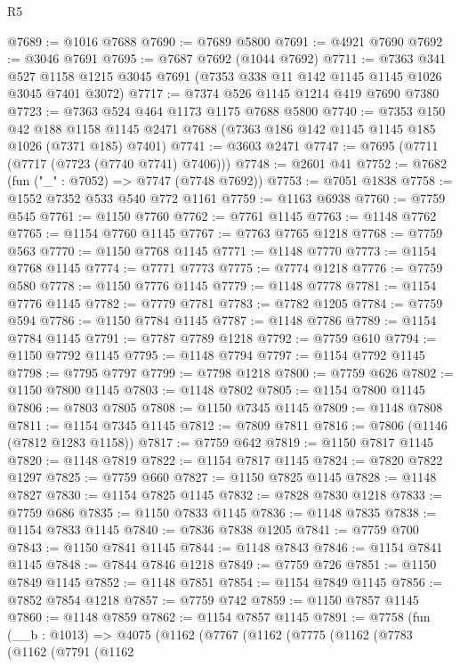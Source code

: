 \begin{lexlean}{R5}
\begin{coremodule}
@7689 := @1016 @7688
@7690 := @7689 @5800
@7691 := @4921 @7690
@7692 := @3046 @7691
@7695 := @7687 @7692 (@1044 @7692)
@7711 := @7363
    @341
    @527
    @1158
    @1215
    @3045
    @7691
    (@7353 @338 @11 @142 @1145 @1145 @1026 @3045 @7401 @3072)
@7717 := @7374 @526 @1145 @1214 @419 @7690 @7380
@7723 := @7363 @524 @464 @1173 @1175 @7688 @5800
@7740 := @7353
    @150
    @42
    @188
    @1158
    @1145
    @2471
    @7688
    (@7363 @186 @142 @1145 @1145 @185 @1026 (@7371 @185) @7401)
@7741 := @3603 @2471
@7747 := @7695 (@7711 (@7717 (@7723 (@7740 @7741) @7406)))
@7748 := @2601 @41
@7752 := @7682 (fun ("_" : @7052) => @7747 (@7748 @7692))
@7753 := @7051 @1838
@7758 := @1552 @7352 @533 @540 @772 @1161
@7759 := @1163 @6938
@7760 := @7759 @545
@7761 := @1150 @7760
@7762 := @7761 @1145
@7763 := @1148 @7762
@7765 := @1154 @7760 @1145
@7767 := @7763 @7765 @1218
@7768 := @7759 @563
@7770 := @1150 @7768 @1145
@7771 := @1148 @7770
@7773 := @1154 @7768 @1145
@7774 := @7771 @7773
@7775 := @7774 @1218
@7776 := @7759 @580
@7778 := @1150 @7776 @1145
@7779 := @1148 @7778
@7781 := @1154 @7776 @1145
@7782 := @7779 @7781
@7783 := @7782 @1205
@7784 := @7759 @594
@7786 := @1150 @7784 @1145
@7787 := @1148 @7786
@7789 := @1154 @7784 @1145
@7791 := @7787 @7789 @1218
@7792 := @7759 @610
@7794 := @1150 @7792 @1145
@7795 := @1148 @7794
@7797 := @1154 @7792 @1145
@7798 := @7795 @7797
@7799 := @7798 @1218
@7800 := @7759 @626
@7802 := @1150 @7800 @1145
@7803 := @1148 @7802
@7805 := @1154 @7800 @1145
@7806 := @7803 @7805
@7808 := @1150 @7345 @1145
@7809 := @1148 @7808
@7811 := @1154 @7345 @1145
@7812 := @7809 @7811
@7816 := @7806 (@1146 (@7812 @1283 @1158))
@7817 := @7759 @642
@7819 := @1150 @7817 @1145
@7820 := @1148 @7819
@7822 := @1154 @7817 @1145
@7824 := @7820 @7822 @1297
@7825 := @7759 @660
@7827 := @1150 @7825 @1145
@7828 := @1148 @7827
@7830 := @1154 @7825 @1145
@7832 := @7828 @7830 @1218
@7833 := @7759 @686
@7835 := @1150 @7833 @1145
@7836 := @1148 @7835
@7838 := @1154 @7833 @1145
@7840 := @7836 @7838 @1205
@7841 := @7759 @700
@7843 := @1150 @7841 @1145
@7844 := @1148 @7843
@7846 := @1154 @7841 @1145
@7848 := @7844 @7846 @1218
@7849 := @7759 @726
@7851 := @1150 @7849 @1145
@7852 := @1148 @7851
@7854 := @1154 @7849 @1145
@7856 := @7852 @7854 @1218
@7857 := @7759 @742
@7859 := @1150 @7857 @1145
@7860 := @1148 @7859
@7862 := @1154 @7857 @1145
@7891 := @7758
    (fun (__b : @1013) =>
    @4075
      (@1162
        (@7767
          (@1162
            (@7775
              (@1162
                (@7783
                  (@1162
                    (@7791
                      (@1162

\end{coremodule}
\end{lexlean}
